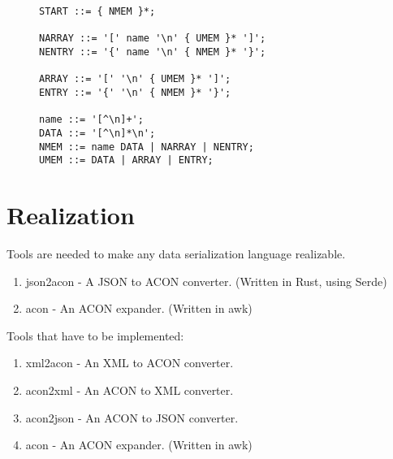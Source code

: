 \documentclass[listof=totoc]{article}
\begin{document}
\begin{figure}[H]
\centering
\begin{varwidth}{\linewidth}
\begin{verbatim}
START ::= { NMEM }*;

NARRAY ::= '[' name '\n' { UMEM }* ']';
NENTRY ::= '{' name '\n' { NMEM }* '}';

ARRAY ::= '[' '\n' { UMEM }* ']';
ENTRY ::= '{' '\n' { NMEM }* '}';

name ::= '[^\n]+';
DATA ::= '[^\n]*\n';
NMEM ::= name DATA | NARRAY | NENTRY;
UMEM ::= DATA | ARRAY | ENTRY;
\end{verbatim}
\end{varwidth}
\caption{}
\end{figure}

\section{Realization}
\noindent Tools are needed to make any data serialization language realizable.

\begin{enumerate}
  \item json2acon - A JSON to ACON converter. (Written in Rust, using Serde)
  \item acon - An ACON expander. (Written in awk)
\end{enumerate}

\noindent Tools that have to be implemented:
\begin{enumerate}
  \item xml2acon - An XML to ACON converter.
  \item acon2xml - An ACON to XML converter.
  \item acon2json - An ACON to JSON converter.
  \item acon - An ACON expander. (Written in awk)
\end{enumerate}


\lstlistoflistings



\end{document}
